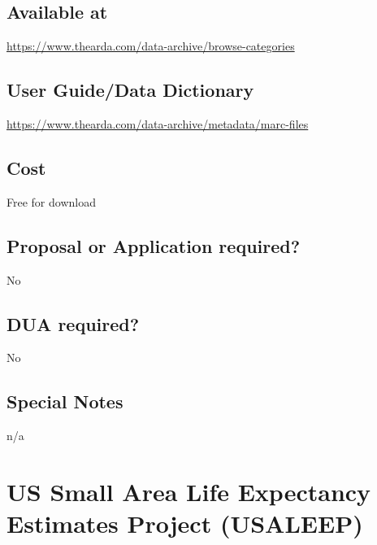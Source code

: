 \documentclass[
]{book}
\begin{document}
\hypertarget{available-at-94}{%
\section{Available at}\label{available-at-94}}

\url{https://www.thearda.com/data-archive/browse-categories}

\hypertarget{user-guidedata-dictionary-94}{%
\section{User Guide/Data Dictionary}\label{user-guidedata-dictionary-94}}

\url{https://www.thearda.com/data-archive/metadata/marc-files}

\hypertarget{cost-94}{%
\section{Cost}\label{cost-94}}

Free for download

\hypertarget{proposal-or-application-required-94}{%
\section{Proposal or Application required?}\label{proposal-or-application-required-94}}

No

\hypertarget{dua-required-94}{%
\section{DUA required?}\label{dua-required-94}}

No

\hypertarget{special-notes-94}{%
\section{Special Notes}\label{special-notes-94}}

n/a

\mainmatter

\hypertarget{us-small-area-life-expectancy-estimates-project-usaleep}{%
\chapter{US Small Area Life Expectancy Estimates Project (USALEEP)}\label{us-small-area-life-expectancy-estimates-project-usaleep}}
\end{document}
